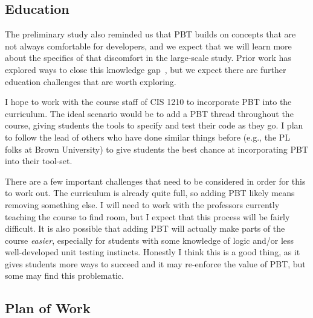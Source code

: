 \subsection{Education }

The preliminary study also reminded us that PBT builds on concepts that are not
always comfortable for developers, and we expect that we will learn more about
the specifics of that discomfort in the large-scale study.  Prior work has
explored ways to close this knowledge
gap~\cite{wrenn2021using,nelson2021automated}, but we expect there are further
education challenges that are worth exploring.

I hope to work with the course staff of CIS 1210 to incorporate PBT into the
curriculum. The ideal scenario would be to add a PBT thread throughout the
course, giving students the tools to specify and test their code as they go.  I
plan to follow the lead of others who have done similar things before (e.g., the
PL folks at Brown University) to give students the best chance at incorporating
PBT into their tool-set.

There are a few important challenges that need to be considered in order for
this to work out.  The curriculum is already quite full, so adding PBT likely
means removing something else. I will need to work with the professors currently
teaching the course to find room, but I expect that this process will be fairly
difficult. It is also possible that adding PBT will actually make parts of the
course {\em easier}, especially for students with some knowledge of logic and/or
less well-developed unit testing instincts. Honestly I think this is a good
thing, as it gives students more ways to succeed and it may re-enforce the value
of PBT, but some may find this problematic.

\subsection{Plan of Work }


